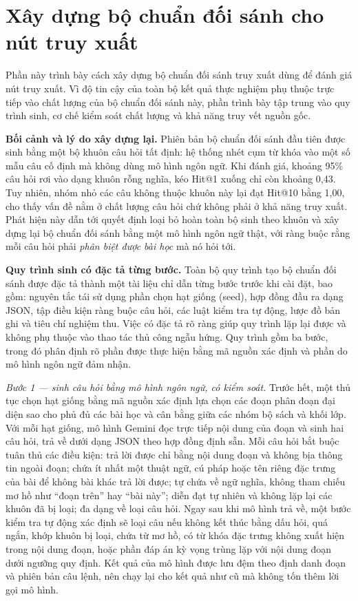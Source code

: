 \documentclass[../DoAn.tex]{subfiles}
\begin{document}
\section{Xây dựng bộ chuẩn đối sánh cho nút truy xuất}
\label{sec:benchmark-retrieve}

Phần này trình bày cách xây dựng bộ chuẩn đối sánh truy xuất dùng để đánh giá nút truy xuất. Vì độ tin cậy của toàn bộ kết quả thực nghiệm phụ thuộc trực tiếp vào chất lượng của bộ chuẩn đối sánh này, phần trình bày tập trung vào quy trình sinh, cơ chế kiểm soát chất lượng và khả năng truy vết nguồn gốc.

\textbf{Bối cảnh và lý do xây dựng lại.} Phiên bản bộ chuẩn đối sánh đầu tiên được sinh bằng một bộ khuôn câu hỏi tất định: hệ thống nhét cụm từ khóa vào một số mẫu câu cố định mà không dùng mô hình ngôn ngữ. Khi đánh giá, khoảng 95\% câu hỏi rơi vào dạng khuôn rỗng nghĩa, kéo Hit@1 xuống chỉ còn khoảng 0,43. Tuy nhiên, nhóm nhỏ các câu không thuộc khuôn này lại đạt Hit@10 bằng 1,00, cho thấy vấn đề nằm ở chất lượng câu hỏi chứ không phải ở khả năng truy xuất. Phát hiện này dẫn tới quyết định loại bỏ hoàn toàn bộ sinh theo khuôn và xây dựng lại bộ chuẩn đối sánh bằng một mô hình ngôn ngữ thật, với ràng buộc rằng mỗi câu hỏi phải \textit{phân biệt được bài học} mà nó hỏi tới.

\textbf{Quy trình sinh có đặc tả từng bước.} Toàn bộ quy trình tạo bộ chuẩn đối sánh được đặc tả thành một tài liệu chỉ dẫn từng bước trước khi cài đặt, bao gồm: nguyên tắc tái sử dụng phần chọn hạt giống (seed), hợp đồng đầu ra dạng JSON, tập điều kiện ràng buộc câu hỏi, các luật kiểm tra tự động, lược đồ bản ghi và tiêu chí nghiệm thu. Việc có đặc tả rõ ràng giúp quy trình lặp lại được và không phụ thuộc vào thao tác thủ công ngẫu hứng. Quy trình gồm ba bước, trong đó phân định rõ phần được thực hiện bằng mã nguồn xác định và phần do mô hình ngôn ngữ đảm nhận.

\textit{Bước 1 --- sinh câu hỏi bằng mô hình ngôn ngữ, có kiểm soát.} Trước hết, một thủ tục chọn hạt giống bằng mã nguồn xác định lựa chọn các đoạn phân đoạn đại diện sao cho phủ đủ các bài học và cân bằng giữa các nhóm bộ sách và khối lớp. Với mỗi hạt giống, mô hình Gemini đọc trực tiếp nội dung của đoạn và sinh hai câu hỏi, trả về dưới dạng JSON theo hợp đồng định sẵn. Mỗi câu hỏi bắt buộc tuân thủ các điều kiện: trả lời được chỉ bằng nội dung đoạn và không bịa thông tin ngoài đoạn; chứa ít nhất một thuật ngữ, cú pháp hoặc tên riêng đặc trưng của bài để không bài khác trả lời được; tự chứa về ngữ nghĩa, không tham chiếu mơ hồ như ``đoạn trên'' hay ``bài này''; diễn đạt tự nhiên và không lặp lại các khuôn đã bị loại; đa dạng về loại câu hỏi. Ngay sau khi mô hình trả về, một bước kiểm tra tự động xác định sẽ loại câu nếu không kết thúc bằng dấu hỏi, quá ngắn, khớp khuôn bị loại, chứa từ mơ hồ, có từ khóa đặc trưng không xuất hiện trong nội dung đoạn, hoặc phần đáp án kỳ vọng trùng lặp với nội dung đoạn dưới ngưỡng quy định. Kết quả của mô hình được lưu đệm theo định danh đoạn và phiên bản câu lệnh, nên chạy lại cho kết quả như cũ mà không tốn thêm lời gọi mô hình.
\end{document}
